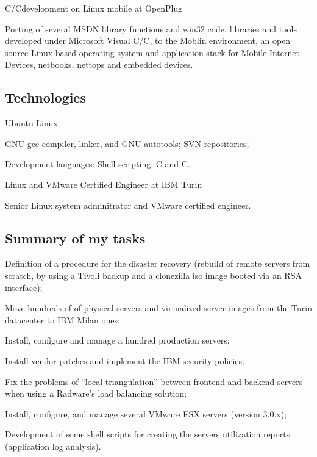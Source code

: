 
\bigskip
{}
   {C/C\plusplus development on Linux mobile at OpenPlug}

\noindent
Porting of several MSDN library functions and win32 code, libraries and tools
developed under Microsoft Visual C/C\plusplus, to the Moblin environment,
an open source Linux-based operating system and application stack for
Mobile Internet Devices, netbooks, nettops and embedded devices.

\subsection{Technologies}

\item{\bdot} Ubuntu Linux;
\item{\bdot} GNU gcc compiler, linker, and GNU autotools; SVN repositories;
\item{\bdot} Development languages: Shell scripting, C and C\plusplus.

\bigskip
{}
   {Linux and VMware Certified Engineer at IBM Turin}

\noindent
Senior Linux system adminitrator and VMware certified engineer.

\subsection{Summary of my tasks}

\item{\bdot} Definition of a procedure for the disaster recovery 
   (rebuild of remote servers from scratch, by using a Tivoli backup and a 
    clonezilla iso image booted via an RSA interface);
\item{\bdot} Move hundreds of of physical servers and virtualized server 
   images from the Turin datacenter to IBM Milan ones;
\item{\bdot} Install, configure and manage a hundred production servers;
\item{\bdot} Install vendor patches and implement the IBM security policies;
\item{\bdot} Fix the problems of ``local triangulation'' between frontend 
   and backend servers when using a Radware's load balancing solution;
\item{\bdot} Install, configure, and manage several VMware ESX servers 
   (version 3.0.x);
\item{\bdot} Development of some shell scripts for creating the servers 
   utilization reports (application log analysis).

